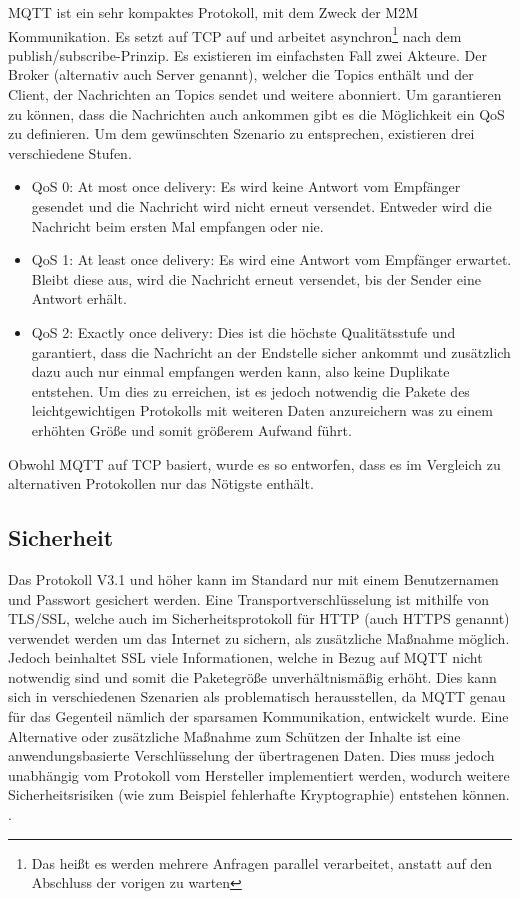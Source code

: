         \ac{MQTT} ist ein sehr kompaktes Protokoll, mit dem Zweck der \ac{M2M} Kommunikation.
        Es setzt auf \ac{TCP} auf und arbeitet asynchron\footnote{Das heißt es werden mehrere Anfragen parallel verarbeitet, anstatt auf den Abschluss der vorigen zu warten} nach dem publish/subscribe-Prinzip. Es existieren im einfachsten Fall zwei Akteure. Der Broker (alternativ auch \glqq Server\grqq{} genannt), welcher die Topics enthält und der Client, der Nachrichten an Topics sendet und weitere abonniert.
        Um garantieren zu können, dass die Nachrichten auch ankommen gibt es die Möglichkeit ein \ac{QoS} zu definieren. Um dem gewünschten Szenario zu entsprechen, existieren drei verschiedene Stufen. 
        \cite{soni2017survey}
        \begin{itemize}
            \item \glqq QoS 0: At most once delivery\grqq{}: Es wird keine Antwort vom Empfänger gesendet und die Nachricht wird nicht erneut versendet. Entweder wird die Nachricht beim ersten Mal empfangen oder nie.
            \item \glqq QoS 1: At least once delivery\grqq{}: Es wird eine Antwort vom Empfänger erwartet. Bleibt diese aus, wird die Nachricht erneut versendet, bis der Sender eine Antwort erhält.
            \item \glqq QoS 2: Exactly once delivery\grqq{}: Dies ist die höchste Qualitätsstufe und garantiert, dass die Nachricht an der Endstelle sicher ankommt und zusätzlich dazu auch nur einmal empfangen werden kann, also keine Duplikate entstehen. Um dies zu erreichen, ist es jedoch notwendig die Pakete des leichtgewichtigen Protokolls mit weiteren Daten anzureichern was zu einem erhöhten Größe und somit größerem Aufwand führt.
        \end{itemize} \cite{gupta_banks_2015}
        Obwohl \ac{MQTT} auf \ac{TCP} basiert, wurde es so entworfen, dass es im Vergleich zu alternativen Protokollen nur das Nötigste enthält. \cite{soni2017survey}

    \subsection{Sicherheit}
        Das Protokoll V3.1 und höher kann im Standard nur mit einem Benutzernamen und Passwort gesichert werden. Eine Transportverschlüsselung ist mithilfe von \ac{TLS}/\ac{SSL}, welche auch im Sicherheitsprotokoll für \ac{HTTP} (auch \ac{HTTPS} genannt) verwendet werden um das Internet zu sichern, als zusätzliche Maßnahme möglich. Jedoch beinhaltet SSL viele Informationen, welche in Bezug auf \ac{MQTT} nicht notwendig sind und somit die Paketegröße unverhältnismäßig erhöht.
        Dies kann sich in verschiedenen Szenarien als problematisch herausstellen, da \ac{MQTT} genau für das Gegenteil nämlich der sparsamen Kommunikation, entwickelt wurde.
        Eine Alternative oder zusätzliche Maßnahme zum Schützen der Inhalte ist eine anwendungsbasierte Verschlüsselung der übertragenen Daten. Dies muss jedoch unabhängig vom Protokoll vom Hersteller implementiert werden, wodurch weitere Sicherheitsrisiken (wie zum Beispiel fehlerhafte Kryptographie) entstehen können. \cite{mqtt_org_2019}.

